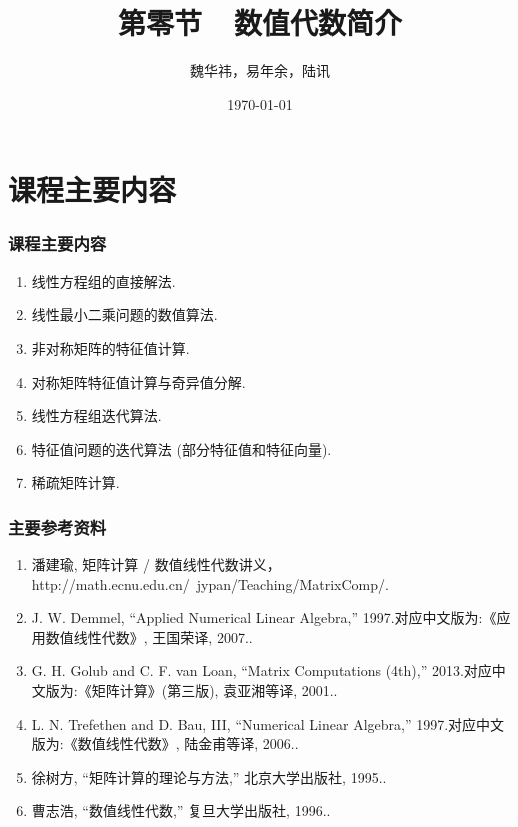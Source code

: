 \documentclass[notheorems,serif]{beamer}
\begin{document}
\title{第零节~~数值代数简介}

\author[]{魏华祎，易年余，陆讯}


\date{\today}



\frame[plain]{\titlepage}


\section{课程主要内容}

\begin{frame}
\frametitle{课程主要内容}
\begin{enumerate}
	\item 线性方程组的直接解法.
	\item 线性最小二乘问题的数值算法.
	\item 非对称矩阵的特征值计算.
	\item 对称矩阵特征值计算与奇异值分解.
	\item 线性方程组迭代算法.
	\item 特征值问题的迭代算法 (部分特征值和特征向量). 
	\item 稀疏矩阵计算.  
\end{enumerate}
\end{frame}

\begin{frame}
\frametitle{主要参考资料}
\begin{enumerate}
    \item { 潘建瑜, 矩阵计算 / 数值线性代数讲义， http://math.ecnu.edu.cn/~jypan/Teaching/MatrixComp/.}
	\item { J. W. Demmel, “Applied Numerical Linear Algebra,” 1997.对应中文版为:《应用数值线性代数》, 王国荣译, 2007.}.
	\item { G. H. Golub and C. F. van Loan, “Matrix Computations (4th),” 2013.对应中文版为:《矩阵计算》(第三版), 袁亚湘等译, 2001.}.
	\item { L. N. Trefethen and D. Bau, III, “Numerical Linear Algebra,” 1997.对应中文版为:《数值线性代数》, 陆金甫等译, 2006.}.
	\item { 徐树方, “矩阵计算的理论与方法,” 北京大学出版社, 1995.}.
	\item { 曹志浩, “数值线性代数,” 复旦大学出版社, 1996.}. 
\end{enumerate}
\end{frame}
\end{document}

